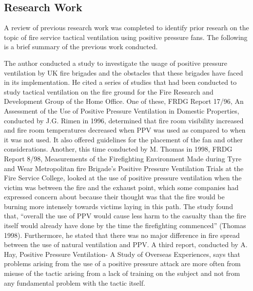 \documentclass{article}
\begin{document}
\subsection{Research Work}
A review of previous research work was completed to identify prior researh on the topic of fire service tactical ventilation using positive pressure fans. The following is a brief summary of the previous work conducted. 

The author conducted a study to investigate the usage of positive pressure ventilation by UK fire brigades and the obstacles that these brigades have faced in its implementation. He cited a series of studies that had been conducted to study tactical ventilation on the fire ground for the Fire Research and Development Group of the Home Office. One of these, FRDG Report 17/96, An Assessment of the Use of Positive Pressure Ventilation in Domestic Properties, conducted by J.G. Rimen in 1996, determined that fire room visibility increased and fire room temperatures decreased when PPV was used as compared to when it was not used. It also offered guidelines for the placement of the fan and other considerations. Another, this time conducted by M. Thomas in 1998, FRDG Report 8/98, Measurements of the Firefighting Environment Made during Tyre and Wear Metropolitan fire Brigade’s Positive Pressure Ventilation Trials at the Fire Service College, looked at the use of positive pressure ventilation when the victim was between the fire and the exhaust point, which some companies had expressed concern about because their thought was that the fire would be burning more intensely towards victims laying in this path. The study found that, “overall the use of PPV would cause less harm to the casualty than the fire itself would already have done by the time the firefighting commenced” (Thomas 1998). Furthermore, he stated that there was no major difference in fire spread between the use of natural ventilation and PPV. A third report, conducted by A. Hay, Positive Pressure Ventilation- A Study of Overseas Experiences, says that problems arising from the use of a positive pressure attack are more often from misuse of the tactic arising from a lack of training on the subject and not from any fundamental problem with the tactic itself.\cite{YatestheU}\\
	
\end{document}
